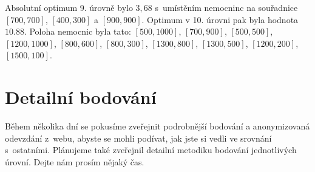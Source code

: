 \documentclass[12pt,a4paper]{article}
\begin{document}
Absolutní optimum 9. úrovně bylo $3,68$ s~umístěním nemocninc na souřadnice $[700, 700]$, $[400, 300]$ a $[900, 900]$.
Optimum v 10. úrovni pak byla hodnota $10.88$. Poloha nemocnic byla tato: $[500,1000]$, $[700,900]$, $[500,500]$, $[1200,1000]$, $[800, 600]$, $[800,300]$, $[1300,800]$, $[1300,500]$, $[1200, 200]$, $[1500,100]$.
\section*{Detailní bodování}

Během několika dní se pokusíme zveřejnit podrobnější bodování a anonymizovaná
odevzdání z~webu, abyste se mohli podívat, jak jste si vedli ve srovnání
s~ostatními. Plánujeme také zveřejnil detailní metodiku bodování jednotlivých
úrovní. Dejte nám prosím nějaký čas.
\end{document}
